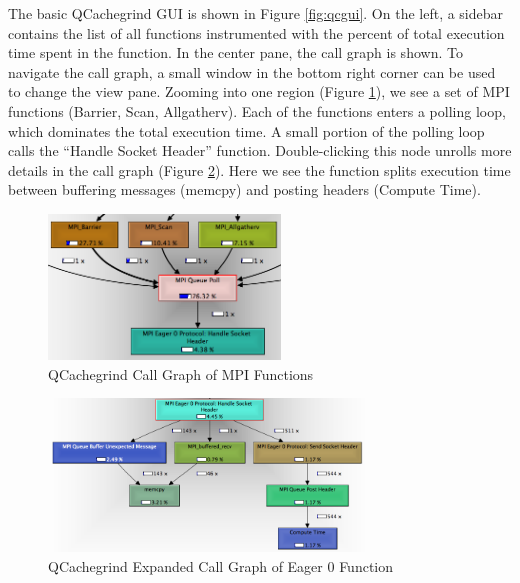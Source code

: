 The basic QCachegrind GUI is shown in Figure \ref{fig:qcgui}.  
On the left, a sidebar contains the list of all functions instrumented with the percent of total execution time spent in the function.
In the center pane, the call graph is shown.  
To navigate the call graph, a small window in the bottom right corner can be used to change the view pane.
Zooming into one region (Figure \ref{fig:qcgraphone}), we see a set of MPI functions (Barrier, Scan, Allgatherv).
Each of the functions enters a polling loop, which dominates the total execution time.  
A small portion of the polling loop calls the ``Handle Socket Header'' function.
Double-clicking this node unrolls more details in the call graph (Figure \ref{fig:qcgraphtwo}).
Here we see the function splits execution time between buffering messages (memcpy) and posting headers (Compute Time).

\begin{figure}[h!]
\centering
\includegraphics[width=0.55\textwidth]{figures/graphviz/callgraph1.png}
\caption{QCachegrind Call Graph of MPI Functions}
\label{fig:qcgraphone}
\end{figure}

\begin{figure}[h!]
\centering
\includegraphics[width=0.75\textwidth]{figures/graphviz/callgraph2.png}
\caption{QCachegrind Expanded Call Graph of Eager 0 Function}
\label{fig:qcgraphtwo}
\end{figure}
